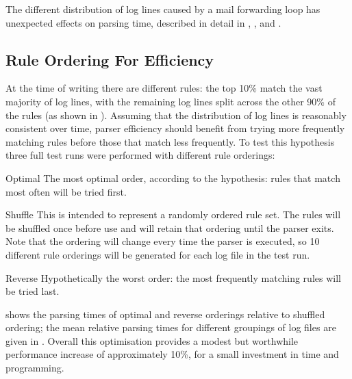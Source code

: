 The different distribution of log lines caused by a mail forwarding loop
has unexpected effects on parsing time, described in detail in
, , and .


\subsection{Rule Ordering For Efficiency}

\label{rule ordering for efficiency}

At the time of writing there are \numberOFrules{} different rules: the top
10\% match the vast majority of log lines, with the remaining log lines
split across the other 90\% of the rules (as shown in ).  Assuming that the distribution of log lines is reasonably
consistent over time, parser efficiency should benefit from trying more
frequently matching rules before those that match less frequently.  To
test this hypothesis three full test runs were performed with different
rule orderings:

\begin{eqlist}

    \item [Optimal]  The most optimal order, according to the hypothesis:
        rules that match most often will be tried first.

    \item [Shuffle] This is intended to represent a randomly ordered rule
        set.  The rules will be shuffled once before use and will retain
        that ordering until the parser exits.  Note that the ordering will
        change every time the parser is executed, so 10 different rule
        orderings will be generated for each log file in the test run.

    \item [Reverse] Hypothetically the worst order: the most frequently
        matching rules will be tried last.

\end{eqlist}

 shows the
parsing times of optimal and reverse orderings relative to shuffled
ordering; the mean relative parsing times for different groupings of log
files are given in .  Overall this optimisation provides a modest but worthwhile
performance increase of approximately 10\%, for a small investment in time
and programming.


